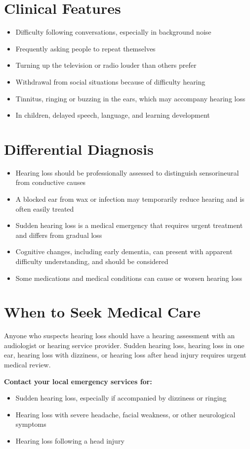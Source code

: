\section*{Clinical Features}
\begin{itemize}
    \item Difficulty following conversations, especially in background noise
    \item Frequently asking people to repeat themselves
    \item Turning up the television or radio louder than others prefer
    \item Withdrawal from social situations because of difficulty hearing
    \item Tinnitus, ringing or buzzing in the ears, which may accompany hearing loss
    \item In children, delayed speech, language, and learning development
\end{itemize}

\section*{Differential Diagnosis}
\begin{itemize}
    \item Hearing loss should be professionally assessed to distinguish sensorineural from conductive causes
    \item A blocked ear from wax or infection may temporarily reduce hearing and is often easily treated
    \item Sudden hearing loss is a medical emergency that requires urgent treatment and differs from gradual loss
    \item Cognitive changes, including early dementia, can present with apparent difficulty understanding, and should be considered
    \item Some medications and medical conditions can cause or worsen hearing loss
\end{itemize}

\section*{When to Seek Medical Care}
Anyone who suspects hearing loss should have a hearing assessment with an audiologist or hearing service provider. Sudden hearing loss, hearing loss in one ear, hearing loss with dizziness, or hearing loss after head injury requires urgent medical review.

\textbf{Contact your local emergency services for:}
\begin{itemize}
    \item Sudden hearing loss, especially if accompanied by dizziness or ringing
    \item Hearing loss with severe headache, facial weakness, or other neurological symptoms
    \item Hearing loss following a head injury
\end{itemize}

